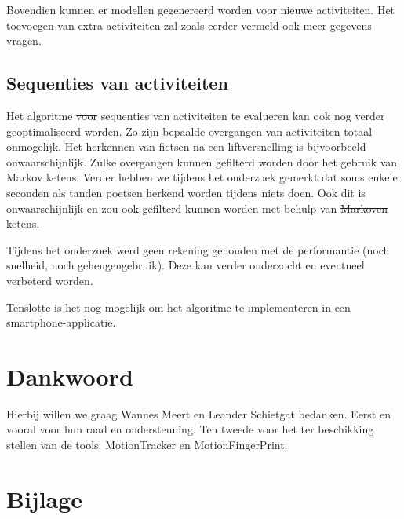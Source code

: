 \documentclass{article}
\providecommand{\DIFadd}[1]{{\protect\color{blue}\uwave{#1}}} %
\providecommand{\DIFdel}[1]{{\protect\color{red}\sout{#1}}}                      %
\providecommand{\DIFaddbegin}{} %
\providecommand{\DIFaddend}{} %
\providecommand{\DIFdelbegin}{} %
\providecommand{\DIFdelend}{} %
\begin{document}
Bovendien kunnen er modellen gegenereerd worden voor nieuwe activiteiten. Het toevoegen van extra activiteiten zal zoals eerder vermeld ook meer gegevens vragen.

\subsection{Sequenties van activiteiten}

Het algoritme \DIFdelbegin \DIFdel{voor }\DIFdelend \DIFaddbegin \DIFadd{om }\DIFaddend sequenties van activiteiten te evalueren kan ook nog verder geoptimaliseerd worden. 
Zo zijn bepaalde overgangen van activiteiten totaal onmogelijk. Het herkennen van fietsen na een liftversnelling is bijvoorbeeld onwaarschijnlijk. Zulke overgangen kunnen gefilterd worden door het gebruik van Markov ketens. Verder hebben we tijdens het onderzoek gemerkt dat soms enkele seconden als tanden poetsen herkend worden tijdens niets doen. Ook dit is onwaarschijnlijk en zou ook gefilterd kunnen worden met behulp van \DIFdelbegin \DIFdel{Markoven }\DIFdelend \DIFaddbegin \DIFadd{Markov }\DIFaddend ketens.

Tijdens het onderzoek werd geen rekening gehouden met de performantie (noch snelheid, noch geheugengebruik). Deze kan verder onderzocht en eventueel verbeterd worden.

	


Tenslotte is het nog mogelijk om het algoritme te implementeren in een smartphone-applicatie.

\section{Dankwoord}

Hierbij willen we graag Wannes Meert en Leander Schietgat bedanken. Eerst en vooral voor hun raad en ondersteuning. Ten tweede voor het ter beschikking stellen van de tools: MotionTracker en MotionFingerPrint.





\DIFdelbegin %
\DIFdelend \newpage
\DIFaddbegin \onecolumn
\DIFaddend 

\section{Bijlage}
\DIFdelbegin %
\DIFdelend \DIFaddbegin 
\end{document}

